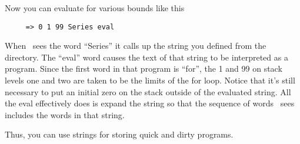 Now you can evaluate for various bounds like this

\begin{verbatim}
     => 0 1 99 Series eval
\end{verbatim}

When \CLAC\ sees the word ``Series'' it calls up the string you defined from the directory. The
``eval'' word causes the text of that string to be interpreted as a program. Since the first
word in that program is ``for'', the 1 and 99 on stack levels one and two are taken to be the
limits of the for loop. Notice that it's still necessary to put an initial zero on the stack
outside of the evaluated string. All the eval effectively does is expand the string so that the
sequence of words \CLAC\ sees includes the words in that string.

Thus, you can use strings for storing quick and dirty programs.
